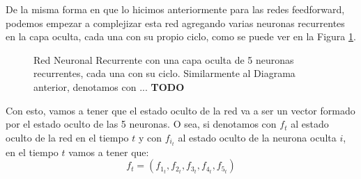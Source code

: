 \documentclass[../../main.tex]{subfiles}
\begin{document}
De la misma forma en que lo hicimos anteriormente para las redes feedforward, podemos
empezar a complejizar esta red agregando varias neuronas recurrentes en la capa oculta,
cada una con su propio ciclo, como se puede ver en la Figura \ref{fig:simple-rnn-2}.
\begin{figure}[h]
    \centering
    \caption{Red Neuronal Recurrente con una capa oculta de 5 neuronas recurrentes,
    cada una con su ciclo. Similarmente al Diagrama anterior, denotamos con ...
    \textbf{TODO}}
    \label{fig:simple-rnn-2}
\end{figure}

Con esto, vamos a tener que el estado oculto de la red va a ser un vector formado por el
estado oculto de las 5 neuronas. O sea, si denotamos con \(f_t\) al estado oculto
de la red en el tiempo \(t\) y con \(f_{i_t}\) al estado oculto de la neurona oculta
\(i\), en el tiempo \(t\) vamos a tener que:
\begin{equation*}
    f_t = (f_{1_t}, f_{2_t}, f_{3_t}, f_{4_t}, f_{5_t})
\end{equation*}
\end{document}
